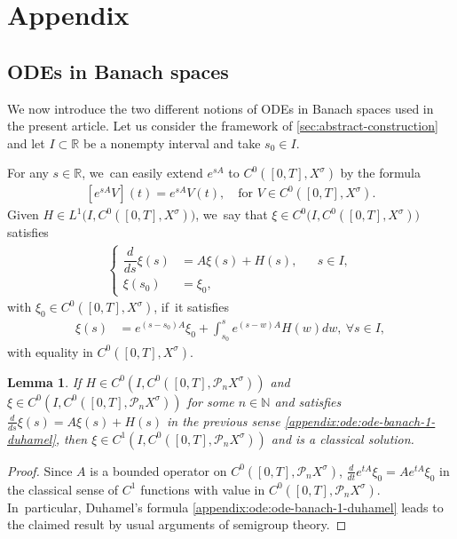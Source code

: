 \documentclass[JEP,XML,SOM,Unicode,published]{cedram}
\newtheorem{lemma}[theorem]{Lemma}
\theoremstyle{definition}
\newcommand{\R}{\mathbb{R}}
\newcommand{\N}{\mathbb{N}}
\renewcommand{\P}{\mathcal{P}}
\begin{document}
\appendix
\setcounter{theorem}{0}
\renewcommand{\thetheorem}{A.\arabic{theorem}}
\renewcommand{\theequation}{A.\arabic{equation}}
\renewcommand{\thesubsection}{A.\arabic{subsection}}

\section*{Appendix}

\subsection{ODEs in Banach spaces} We now introduce the two different notions of ODEs in Banach spaces used in the present article. Let us consider the framework of \cref{sec:abstract-construction} and let $I\subset \R$ be a nonempty interval and take $s_0\in I$.

For any $s\in \R$, we~can easily extend $e^{sA}$ to $C^{0}([0,T],X^{\sigma})$ by the formula
\begin{align*}
\left[e^{sA}V\right](t)=e^{sA}V(t),\quad \text{for $V\in C^{0}([0,T],X^{\sigma})$.}
\end{align*}
Given $H\in L^{1}\big(I,C^{0}([0,T],X^{\sigma})\big)$, we~say that $\xi\in C^{0}\big(I,C^{0}([0,T],X^{\sigma})\big)$ satisfies
\begin{align}\label{appendix:ode:ode-banach-1}
\left\{\begin{aligned}
\dfrac{d}{ds}\xi(s)&=A \xi(s)+H(s), && s\in I, \\
\xi(s_0)&=\xi_0, &&
\end{aligned}\right.
\end{align}
with $\xi_0\in C^{0}([0,T],X^{\sigma})$, if~it satisfies
\begin{align}\label{appendix:ode:ode-banach-1-duhamel}
\xi(s)&=e^{(s-s_0)A}\xi_0+\int_{s_0}^{s}e^{(s-w)A}H(w)dw,\ \forall s\in I,
\end{align}
with equality in $C^{0}([0,T],X^{\sigma})$.
\begin{lemma}
\label{lmDuhamelCauchy}
If $H\in C^0\left(I,C^{0}([0,T],\P_{n}X^{\sigma})\right)$ and $\xi\in C^{0}\left(I,C^{0}([0,T],\P_{n}X^{\sigma})\right)$ for some $n\in\N$ and satisfies
$ \frac{d}{ds}\xi(s)=A \xi(s)+H(s)$ in the previous sense \eqref{appendix:ode:ode-banach-1-duhamel}, then $\xi\in C^{1}\left(I,C^{0}([0,T],\P_{n}X^{\sigma})\right)$ and is a classical solution.
\end{lemma}
\begin{proof}
Since $A$ is a bounded operator on $C^{0}([0,T],\P_{n}X^{\sigma})$, $\frac{d}{dt}e^{tA}\xi_0=A e^{tA}\xi_0$ in the classical sense of $C^1$ functions with value in $C^{0}([0,T],\P_{n}X^{\sigma})$. In~particular, Duhamel's formula \eqref{appendix:ode:ode-banach-1-duhamel} leads to the claimed result by usual arguments of semigroup theory.
\end{proof}
\end{document}
